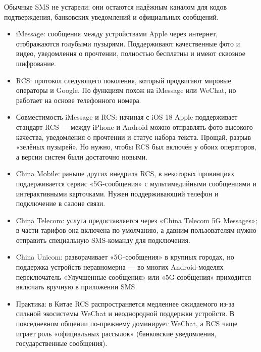 
Обычные SMS не устарели: они остаются надёжным каналом для кодов подтверждения, банковских уведомлений и официальных сообщений.

\begin{itemize}
  \item iMessage: сообщения между устройствами Apple через интернет, отображаются голубыми пузырями. Поддерживают качественные фото и видео, уведомления о прочтении, полностью бесплатны и имеют сквозное шифрование.
  \item RCS: протокол следующего поколения, который продвигают мировые операторы и Google. По функциям похож на iMessage или WeChat, но работает на основе телефонного номера.
  \item Совместимость iMessage и RCS: начиная с iOS 18 Apple поддерживает стандарт RCS — между iPhone и Android можно отправлять фото высокого качества, уведомления о прочтении и статус набора текста. Прощай, разрыв «зелёных пузырей». Но нужно, чтобы RCS был включён у обоих операторов, а версии систем были достаточно новыми.
\end{itemize}


\begin{itemize}
  \item China Mobile: раньше других внедрила RCS, в некоторых провинциях поддерживается сервис «5G-сообщения» с мультимедийными сообщениями и интерактивными карточками. Нужен поддерживающий телефон и подключение в салоне связи.
  \item China Telecom: услуга предоставляется через «China Telecom 5G Messages»; в части тарифов она включена по умолчанию, а давним пользователям нужно отправить специальную SMS-команду для подключения.
  \item China Unicom: разворачивает «5G-сообщения» в крупных городах, но поддержка устройств неравномерна — во многих Android-моделях переключатель «Улучшенные сообщения» или «5G-сообщения» приходится включать вручную в приложении SMS.
  \item Практика: в Китае RCS распространяется медленнее ожидаемого из-за сильной экосистемы WeChat и неоднородной поддержки устройств. В повседневном общении по-прежнему доминирует WeChat, а RCS чаще играет роль «официальных рассылок» (банковские уведомления, государственные сообщения).
\end{itemize}

